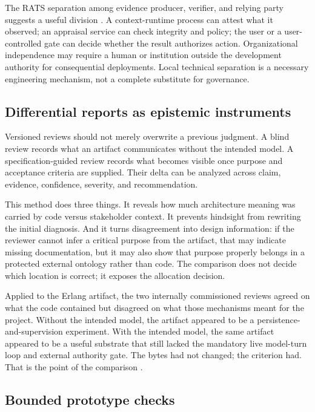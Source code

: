 \documentclass[10pt,a4paper]{article}
\begin{document}
The RATS separation among evidence producer, verifier, and relying party suggests a useful division \cite{rfc9334}. A context-runtime process can attest what it observed; an appraisal service can check integrity and policy; the user or a user-controlled gate can decide whether the result authorizes action. Organizational independence may require a human or institution outside the development authority for consequential deployments. Local technical separation is a necessary engineering mechanism, not a complete substitute for governance.

\subsection{Differential reports as epistemic instruments}

Versioned reviews should not merely overwrite a previous judgment. A blind review records what an artifact communicates without the intended model. A specification-guided review records what becomes visible once purpose and acceptance criteria are supplied. Their delta can be analyzed across claim, evidence, confidence, severity, and recommendation.

This method does three things. It reveals how much architecture meaning was carried by code versus stakeholder context. It prevents hindsight from rewriting the initial diagnosis. And it turns disagreement into design information: if the reviewer cannot infer a critical purpose from the artifact, that may indicate missing documentation, but it may also show that purpose properly belongs in a protected external ontology rather than code. The comparison does not decide which location is correct; it exposes the allocation decision.

Applied to the Erlang artifact, the two internally commissioned reviews agreed on what the code contained but disagreed on what those mechanisms meant for the project. Without the intended model, the artifact appeared to be a persistence-and-supervision experiment. With the intended model, the same artifact appeared to be a useful substrate that still lacked the mandatory live model-turn loop and external authority gate. The bytes had not changed; the criterion had. That is the point of the comparison \cite{daybreakblind,daybreakguided}.

\subsection{Bounded prototype checks}
\end{document}
